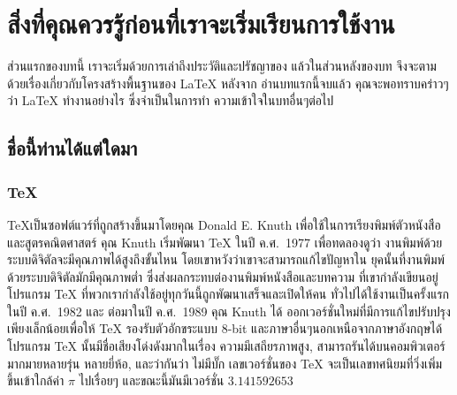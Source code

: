 
\chapter[สิ่งที่คุณควรรู้\ldots]{สิ่งที่คุณควรรู้ก่อนที่เราจะเริ่มเรียนการใช้งาน \LaTeXe}
ส่วนแรกของบทนี้ เราจะเริ่มด้วยการเล่าถึงประวัติและปรัชญาของ \LaTeXe{}
แล้วในส่วนหลังของบท จึงจะตามด้วยเรื่องเกี่ยวกับโครงสร้างพื้นฐานของ \LaTeX{} หลังจาก%
อ่านบทแรกนี้จบแล้ว คุณจะพอทราบคร่าวๆว่า \LaTeX{} ทำงานอย่างไร ซึ่งจำเป็นในการทำ%
ความเข้าใจในบทอื่นๆต่อไป

\section{ชื่อนี้ท่านได้แต่ใดมา}

\subsection{\TeX}

\TeX เป็นซอฟต์แวร์ที่ถูกสร้างขึ้นมาโดยคุณ Donald E. Knuth เพื่อใช้ในการเรียงพิมพ์ตัวหนังสือ
และสูตรคณิตศาสตร์ คุณ Knuth เริ่มพัฒนา \TeX{} ในปี ค.ศ.\ 1977 เพื่อทดลองดูว่า%
งานพิมพ์ด้วยระบบดิจิตัลจะมีคุณภาพได้สูงถึงขั้นไหน โดยเขาหวังว่าเขาจะสามารถแก้ไขปัญหาใน%
ยุคนั้นที่งานพิมพ์ด้วยระบบดิจิตัลมักมีคุณภาพต่ำ ซึ่งส่งผลกระทบต่องานพิมพ์หนังสือและบทความ%
ที่เขากำลังเขียนอยู่ โปรแกรม \TeX{} ที่พวกเรากำลังใช้อยู่ทุกวันนี้ถูกพัฒนาเสร็จและเปิดให้คน%
ทั่วไปได้ใช้งานเป็นครั้งแรกในปี ค.ศ.\ 1982 และ ต่อมาในปี ค.ศ.\ 1989 คุณ Knuth ได้%
ออกเวอร์ชั่นใหม่ที่มีการแก้ไขปรับปรุงเพียงเล็กน้อยเพื่อให้ \TeX{} รองรับตัวอักขระแบบ 8-bit
และภาษาอื่นๆนอกเหนือจากภาษาอังกฤษได้ โปรแกรม \TeX{} นั้นมีชื่อเสียงโด่งดังมากในเรื่อง%
ความมีเสถียรภาพสูง, สามารถรันได้บนคอมพิวเตอร์มากมายหลายรุ่น หลายยี่ห้อ, และว่ากันว่า%
ไม่มีบั๊ก เลขเวอร์ชั่นของ \TeX{} จะเป็นเลขทศนิยมที่วิ่งเพิ่มขึ้นเข้าใกล้ค่า $\pi$ ไปเรื่อยๆ
และขณะนี้มันมีเวอร์ชั่น $3.141592653$

